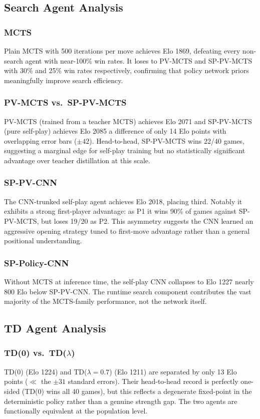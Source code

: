 \documentclass[conference]{IEEEtran}
\begin{document}
\subsection{Search Agent Analysis}

\subsubsection{MCTS}
Plain MCTS with 500 iterations per move achieves Elo 1869, defeating every
non-search agent with near-100\% win rates. It loses to PV-MCTS and SP-PV-MCTS
with 30\% and 25\% win rates respectively, confirming that policy network priors
meaningfully improve search efficiency.

\subsubsection{PV-MCTS vs.\ SP-PV-MCTS}
PV-MCTS (trained from a teacher MCTS) achieves Elo 2071 and SP-PV-MCTS (pure
self-play) achieves Elo 2085 a difference of only 14 Elo points with
overlapping error bars ($\pm 42$). Head-to-head, SP-PV-MCTS wins 22/40 games,
suggesting a marginal edge for self-play training but no statistically significant
advantage over teacher distillation at this scale.

\subsubsection{SP-PV-CNN}
The CNN-trunked self-play agent achieves Elo 2018, placing third. Notably it
exhibits a strong first-player advantage: as P1 it wins 90\% of games against
SP-PV-MCTS, but loses 19/20 as P2. This asymmetry suggests the CNN learned an
aggressive opening strategy tuned to first-move advantage rather than a general
positional understanding.

\subsubsection{SP-Policy-CNN}
Without MCTS at inference time, the self-play CNN collapses to Elo 1227 nearly
800 Elo below SP-PV-CNN. The runtime search component contributes the vast
majority of the MCTS-family performance, not the network itself.

\subsection{TD Agent Analysis}

\subsubsection{TD(0) vs.\ TD($\lambda$)}
TD(0) (Elo 1224) and TD($\lambda = 0.7$) (Elo 1211) are separated by only 13
Elo points ($\ll$ the $\pm 31$ standard errors). Their head-to-head record is
perfectly one-sided (TD(0) wins all 40 games), but this reflects a degenerate
fixed-point in the deterministic policy rather than a genuine strength gap. The
two agents are functionally equivalent at the population level.
\end{document}
